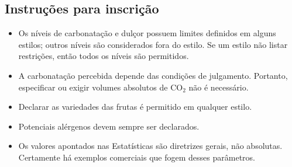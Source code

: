 \subsection*{Instruções para inscrição}

\begin{itemize}
\item Os níveis de carbonatação e dulçor possuem limites definidos em alguns estilos; outros níveis são considerados fora do estilo. Se um estilo não listar restrições, então todos os níveis são permitidos.
\item A carbonatação percebida depende das condições de julgamento. Portanto, especificar ou exigir volumes absolutos de CO$_2$ não é necessário.
\item Declarar as variedades das frutas é permitido em qualquer estilo.
\item Potenciais alérgenos devem sempre ser declarados.
\item Os valores apontados nas Estatísticas são diretrizes gerais, não absolutas. Certamente há exemplos comerciais que fogem desses parâmetros.
\end{itemize}
